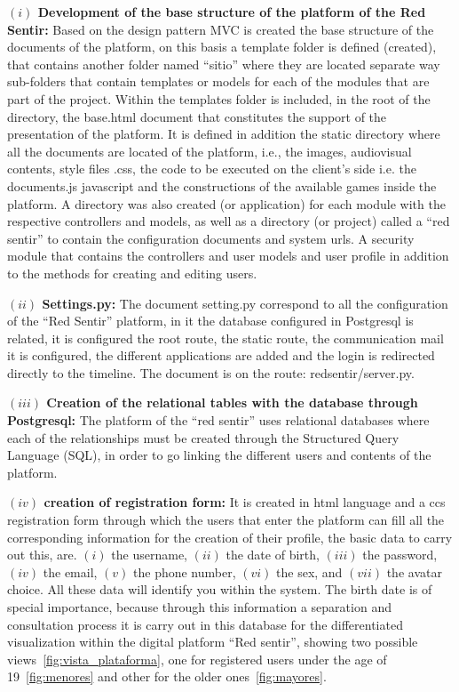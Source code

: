 \documentclass[journal,transmag]{IEEEtran}
\begin{document}
\textbf{$(i)$ Development of the base structure of the platform of the Red Sentir:} Based on the design pattern MVC is created the base structure of the documents of the platform, on this basis a template folder is defined (created), that contains another folder named ``sitio'' where they are located separate way sub-folders that contain templates or models for each of the modules that are part of the project. Within the templates folder is included, in the root of the directory, the base.html document that constitutes the support of the presentation of the platform. It is defined in addition the static directory where all the documents are located of the platform, i.e., the images, audiovisual contents, style files .css, the code to be executed on the client's side i.e. the documents.js javascript and the constructions of the available games inside the platform. A directory was also created (or application) for each module with the respective controllers and models, as well as a directory (or project) called a ``red sentir'' to contain the configuration documents and system urls. A security module that contains the controllers and user models and user profile in addition to the methods for creating and editing users.

\textbf{$(ii)$ Settings.py:} The document setting.py correspond to all the configuration of the “Red Sentir” platform, in it the database configured in Postgresql is related, it is configured the root route, the static route, the communication mail it is configured, the different applications are added and the login is redirected directly to the timeline. The document is on the route: redsentir/server.py.

\textbf{$(iii)$ Creation of the relational tables with the database through Postgresql:} The platform of the “red sentir” uses relational databases where each of the relationships must be created through the Structured Query Language (SQL), in order to go linking the different users and contents of the platform.

\textbf{$(iv)$ creation of registration form:} It is created in html language and a ccs registration form through which the users that enter the platform can fill all the corresponding information for the creation of their profile, the basic data to carry out this, are. $(i)$ the username, $(ii)$ the date of birth, $(iii)$ the password, $(iv)$ the email, $(v)$ the phone number, $(vi)$ the sex, and $(vii)$ the avatar choice. All these data will identify you within the system. The birth date is of special importance, because through this information a separation and consultation process it is carry out in this database for the differentiated visualization within the digital platform “Red sentir”, showing two possible views~\ref{fig:vista_plataforma}, one for registered users under the age of 19~\ref{fig:menores} and other for the older ones~\ref{fig:mayores}.
\end{document}
